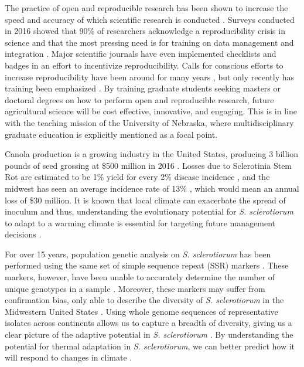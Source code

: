 \documentclass[12pt,letterpaper]{article}
\begin{document}
The practice of open and reproducible research has been shown to increase the speed and accuracy of which scientific research is conducted \citep{stewart-lowndes2017path, wilson2016good}.
Surveys conducted in 2016 showed that 90\% of researchers acknowledge a reproducibility crisis in science \citep{baker2016scientists} and that the most pressing need is for training on data management and integration \citep{barone2017unmet}. 
Major scientific journals have even implemented checklists \citep{nature2017announcement} and badges \citep{kidwell2016badges} in an effort to incentivize reproducibility.
Calls for conscious efforts to increase reproducibility have been around for many years \citep{buckheit1995wavelab, peng2011reproducible}, but only recently has training been emphasized \citep{schmidt2016stepping, stewart-lowndes2017path, wilson2016good}. 
By training graduate students seeking masters or doctoral degrees on how to perform open and reproducible research, future agricultural science will be cost effective, innovative, and engaging. 
This is in line with the teaching mission of the University of Nebraska, where multidisciplinary graduate education is explicitly mentioned as a focal point.

Canola production is a growing industry in the United States, producing 3 billion pounds of seed grossing at \$500 million in 2016 \citep{usda2017production, usda2017values}. Losses due to Sclerotinia Stem Rot are estimated to be 1\% yield for every 2\% disease incidence \citep{delrio2007impact}, and the midwest has seen an average incidence rate of 13\% \citep{markell2009sclerotinia}, which would mean an annual loss of \$30 million. 
It is known that local climate can exacerbate the spread of inoculum and thus, understanding the evolutionary potential for \textit{S. sclerotiorum} to adapt to a warming climate is essential for targeting future management decisions \citep{attanayake2014inferring,shea2000integrated,billiard2012sex}.

For over 15 years, population genetic analysis on \textit{S. sclerotiorum} has been performed using the same set of simple sequence repeat (SSR) markers \citep{sirjusingh2001characterization}. 
These markers, however, have been unable to accurately determine the number of unique genotypes in a sample \citep{lehner2017independently, lehner2017sclerotinia,arnaud2007standardizing}.
Moreover, these markers may suffer from confirmation bias, only able to describe the diversity of \textit{S. sclerotiorum} in the Midwestern United States \citep{attanayake2013sclerotinia}. 
Using whole genome sequences of representative isolates across continents allows us to capture a breadth of diversity, giving us a clear picture of the adaptive potential in \textit{S. sclerotiorum} \citep{grunwald2016population}.
By understanding the potential for thermal adaptation in \textit{S. sclerotiorum}, we can better predict how it will respond to changes in climate \citep{croll2016genetic}.
\end{document}
